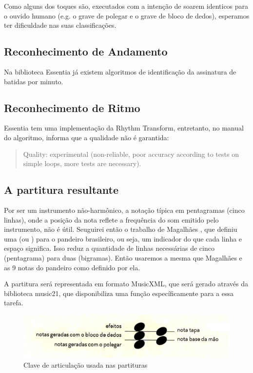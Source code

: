 \documentclass[
  dissertacao,
  brazil
]{ThesisPUC}
\begin{document}
Como alguns dos toques são, executados com a intenção de soarem identicos para o ouvido humano (e.g. o grave de polegar e o grave de bloco de dedos), esperamos ter dificuldade nas suas classificações.

\subsection{Reconhecimento de Andamento}
Na biblioteca Essentia já existem algoritmos de identificação da assinatura de batidas por minuto.

\subsection{Reconhecimento de Ritmo}
Essentia tem uma implementação da Rhythm Transform, entretanto, no manual do algoritmo, informa que a qualidade não é garantida:
\begin{quote}
    Quality: experimental (non-reliable, poor accuracy according to tests on simple loops, more tests are necessary).
\end{quote}

\subsection{A partitura resultante}
Por ser um instrumento não-harmônico, a notação típica em pentagramas (cinco linhas), onde a posição da nota reflete a frequência do som emitido pelo instrumento, não é útil. Seuguirei então o trabalho de Magalhães \cite{magalhaes2018tecnica}, que definiu uma \CA (ou \ca) para o pandeiro brasileiro, ou seja, um indicador do que cada linha e espaço significa. Isso reduz a quantidade de linhas necessárias de cinco (pentagrama) para duas (bigramas). Então usaremos a mesma \ca que Magalhães e as 9 notas do pandeiro como definido por ela.

A partitura será representada em formato MusicXML, que será gerado através da biblioteca music21, que disponibiliza uma função específicamente para a essa tarefa.

\begin{figure}
    \centering
    \includegraphics[width=\textwidth]{ClaveDeArticulacao.jpg}
    \caption{Clave de articulação usada nas partituras}
    \label{fig:clave}
\end{figure}
\end{document}
